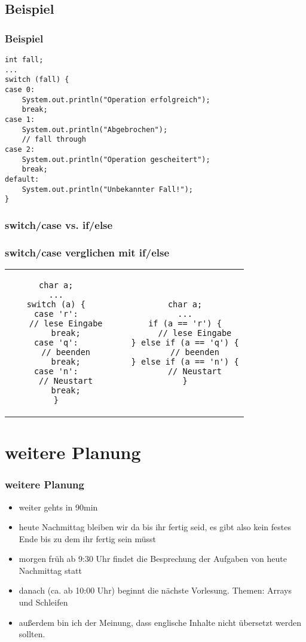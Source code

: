 \documentclass[final]{beamer}
\begin{document}
\subsection{Beispiel}
\begin{frame}[containsverbatim]
	\frametitle{Beispiel}
	\begin{lstlisting}
int fall;
...
switch (fall) {
case 0:
	System.out.println("Operation erfolgreich");
	break;
case 1:
	System.out.println("Abgebrochen");
	// fall through
case 2:
	System.out.println("Operation gescheitert");
	break;
default:
	System.out.println("Unbekannter Fall!");
}
	\end{lstlisting}
\end{frame}

\subsubsection{switch/case vs. if/else}
\begin{frame}[containsverbatim]
\frametitle{switch/case verglichen mit if/else}
	\begin{tabular}{c c c c}
	\begin{lstlisting}
char a;
...
switch (a) {
case 'r':
	// lese Eingabe
	break;
case 'q':
	// beenden
	break;
case 'n':
	// Neustart
	break;
}
	\end{lstlisting} 

& & &
	
	\begin{lstlisting}
char a;
...
if (a == 'r') {
	// lese Eingabe
} else if (a == 'q') {
	// beenden
} else if (a == 'n') {
	// Neustart
}
	\end{lstlisting}\\
	\end{tabular}
\end{frame}

\section{weitere Planung}
\begin{frame}
\frametitle{weitere Planung}
  \begin{itemize}
	\item{weiter gehts in 90min}
	\item{heute Nachmittag bleiben wir da bis ihr fertig seid, es gibt also kein festes Ende bis zu dem ihr fertig sein müsst}
	\item{morgen früh ab 9:30 Uhr findet die Besprechung der Aufgaben von heute Nachmittag statt}
	\item{danach (ca. ab 10:00 Uhr) beginnt die nächste Vorlesung. Themen: Arrays und Schleifen}
	\item{außerdem bin ich der Meinung, dass englische Inhalte nicht übersetzt werden sollten.}
  \end{itemize}
\end{frame}
\end{document}
